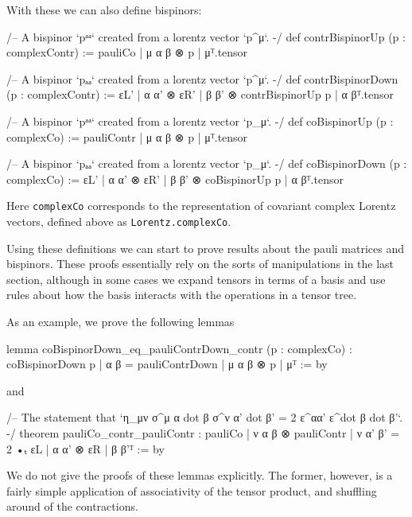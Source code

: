 \documentclass[a4paper, 11pt]{article}
\DeclareRobustCommand{\myinline}{\lstinline}
\begin{document}
With these we can also define bispinors:
\begin{codeLong}
/-- A bispinor `pᵃᵃ` created from a lorentz vector `p^μ`. -/
def contrBispinorUp (p : complexContr) :=
  {pauliCo | μ α β ⊗ p | μ}ᵀ.tensor

/-- A bispinor `pₐₐ` created from a lorentz vector `p^μ`. -/
def contrBispinorDown (p : complexContr) :=
  {εL' | α α' ⊗ εR' | β β' ⊗ contrBispinorUp p | α β}ᵀ.tensor

/-- A bispinor `pᵃᵃ` created from a lorentz vector `p_μ`. -/
def coBispinorUp (p : complexCo) := {pauliContr | μ α β ⊗ p | μ}ᵀ.tensor

/-- A bispinor `pₐₐ` created from a lorentz vector `p_μ`. -/
def coBispinorDown (p : complexCo) :=
  {εL' | α α' ⊗ εR' | β β' ⊗ coBispinorUp p | α β}ᵀ.tensor
\end{codeLong}
Here  \myinline|complexCo| corresponds to the representation of covariant complex Lorentz vectors, 
defined above as \myinline|Lorentz.complexCo|.

Using these definitions we can start to prove results about the pauli matrices and bispinors. 
These proofs essentially rely on the sorts of manipulations in the last section, although in some cases 
we expand tensors in terms of a basis and use rules about how the basis interacts with the operations in a tensor tree. 

As an example, we prove the following lemmas
\begin{code}
lemma coBispinorDown_eq_pauliContrDown_contr (p : complexCo) :
  {coBispinorDown p | α β = pauliContrDown | μ α β ⊗ p | μ}ᵀ := by
\end{code}
and 
\begin{code}
/-- The statement that `η_{μν} σ^{μ α dot β} σ^{ν α' dot β'} = 2 ε^{αα'} ε^{dot β dot β'}`. -/
theorem pauliCo_contr_pauliContr :
    {pauliCo | ν α β ⊗ pauliContr | ν α' β' = 2 •ₜ εL | α α' ⊗ εR | β β'}ᵀ := by
\end{code}
We do not give the proofs of these lemmas explicitly. 
The former, however, is a fairly simple application of associativity of the tensor product, and shuffling 
around of the contractions. 
\end{document}
